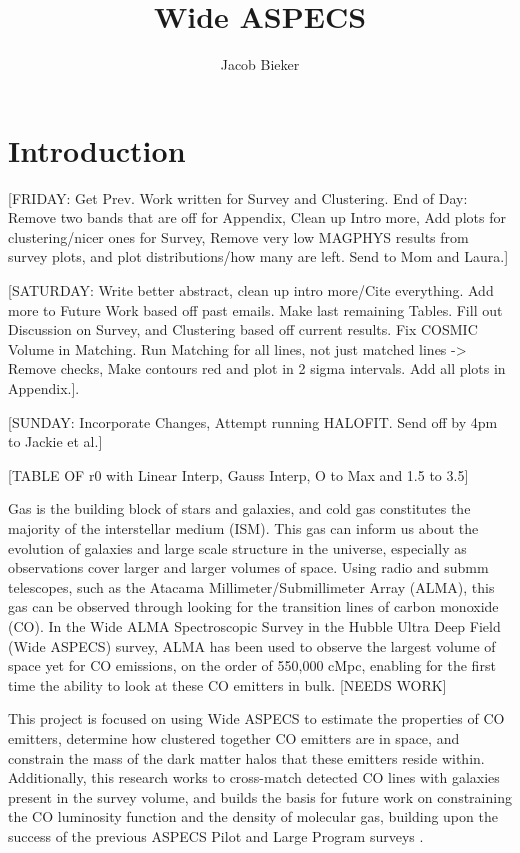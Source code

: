 \documentclass[twoside,single]{lion-msc}
\title{Wide ASPECS}
\author{Jacob Bieker}
\affiliation{Leiden Observatory, Leiden University}
\begin{document}
\maketitle

\setcounter{page}{2}
\tableofcontents
\cleardoublepage

\setcounter{page}{1}
\chapter{Introduction}

[FRIDAY: Get Prev. Work written for Survey and Clustering. End of Day: Remove two bands that are off for Appendix, Clean up Intro more, Add plots for clustering/nicer ones for Survey, Remove very low MAGPHYS results from survey plots, and plot distributions/how many are left. Send to Mom and Laura.]

[SATURDAY: Write better abstract, clean up intro more/Cite everything. Add more to Future Work based off past emails. Make last remaining Tables. Fill out Discussion on Survey, and Clustering based off current results. Fix COSMIC Volume in Matching. Run Matching for all lines, not just matched lines -> Remove checks, Make contours red and plot in 2 sigma intervals. Add all plots in Appendix.]. 

[SUNDAY: Incorporate Changes, Attempt running HALOFIT. Send off by 4pm to Jackie et al.] 

[TABLE OF r0 with Linear Interp, Gauss Interp, O to Max and 1.5 to 3.5]

Gas is the building block of stars and galaxies, and cold gas constitutes the majority of the interstellar medium (ISM). This gas can inform us about the evolution of galaxies and large scale structure in the universe, especially as observations cover larger and larger volumes of space. Using radio and submm telescopes, such as the Atacama Millimeter/Submillimeter Array (ALMA), this gas can be observed through looking for the transition lines of carbon monoxide (CO). In the Wide ALMA Spectroscopic Survey in the Hubble Ultra Deep Field (Wide ASPECS) survey, ALMA has been used to observe the largest volume of space yet for CO emissions, on the order of 550,000 cMpc, enabling for the first time the ability to look at these CO emitters in bulk. [NEEDS WORK]

This project is focused on using Wide ASPECS to estimate the properties of CO emitters, determine how clustered together CO emitters are in space, and constrain the mass of the dark matter halos that these emitters reside within. Additionally, this research works to cross-match detected CO lines with galaxies present in the survey volume, and builds the basis for future work on constraining the CO luminosity function and the density of molecular gas, building upon the success of the previous ASPECS Pilot and Large Program surveys \cite{walter2016alma, decarli2019alma}. 
\end{document}
